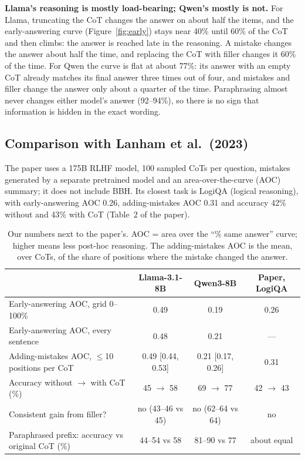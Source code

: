 \documentclass[11pt,a4paper]{article}
\begin{document}
\noindent\textbf{Llama's reasoning is mostly load-bearing; Qwen's mostly is not.} For Llama, truncating the CoT changes the
answer on about half the items, and the early-answering curve (Figure~\ref{fig:early}) stays near 40\% until 60\% of the
CoT and then climbs: the answer is reached late in the reasoning. A mistake changes the answer about half the time, and
replacing the CoT with filler changes it 60\% of the time. For Qwen the curve is flat at about 77\%: its answer with an
empty CoT already matches its final answer three times out of four, and mistakes and filler change the answer only about
a quarter of the time. Paraphrasing almost never changes either model's answer (92--94\%), so there is no sign that
information is hidden in the exact wording.

\subsection{Comparison with Lanham et al.\ (2023)}
\label{sec:paper}
The paper uses a 175B RLHF model, 100 sampled CoTs per question, mistakes generated by a separate pretrained model and an
area-over-the-curve (AOC) summary; it does not include BBH. Its closest task is LogiQA (logical reasoning), with
early-answering AOC 0.26, adding-mistakes AOC 0.31 and accuracy 42\% without and 43\% with CoT (Table~2 of the paper).

\begin{table}[h]
\centering\footnotesize
\begin{tabular}{@{}lccc@{}}
\toprule
& Llama-3.1-8B & Qwen3-8B & Paper, LogiQA \\
\midrule
Early-answering AOC, grid 0--100\% & 0.49 & 0.19 & 0.26 \\
Early-answering AOC, every sentence & 0.48 & 0.21 & --- \\
Adding-mistakes AOC, $\le$10 positions per CoT & 0.49 [0.44, 0.53] & 0.21 [0.17, 0.26] & 0.31 \\
Accuracy without $\to$ with CoT (\%) & 45 $\to$ 58 & 69 $\to$ 77 & 42 $\to$ 43 \\
Consistent gain from filler? & no (43--46 vs 45) & no (62--64 vs 64) & no \\
Paraphrased prefix: accuracy vs original CoT (\%) & 44--54 vs 58 & 81--90 vs 77 & about equal \\
\bottomrule
\end{tabular}
\caption{Our numbers next to the paper's. AOC = area over the ``\% same answer'' curve; higher means less post-hoc
reasoning. The adding-mistakes AOC is the mean, over CoTs, of the share of positions where the mistake changed the answer.}
\label{tab:paper}
\end{table}
\end{document}
